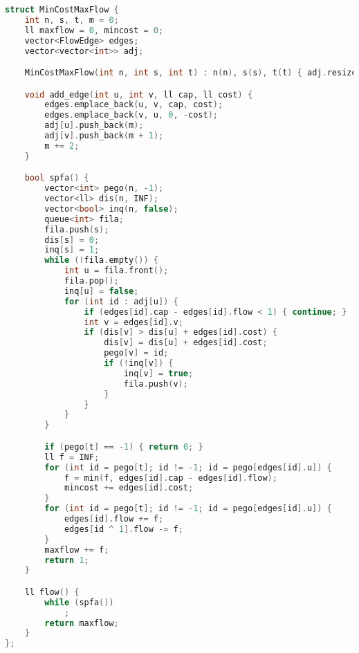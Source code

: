 \documentclass[11pt, a4paper, twoside]{book}
\begin{document}
\begin{lstlisting}[language=C++]
struct MinCostMaxFlow {
    int n, s, t, m = 0;
    ll maxflow = 0, mincost = 0;
    vector<FlowEdge> edges;
    vector<vector<int>> adj;

    MinCostMaxFlow(int n, int s, int t) : n(n), s(s), t(t) { adj.resize(n); }

    void add_edge(int u, int v, ll cap, ll cost) {
        edges.emplace_back(u, v, cap, cost);
        edges.emplace_back(v, u, 0, -cost);
        adj[u].push_back(m);
        adj[v].push_back(m + 1);
        m += 2;
    }

    bool spfa() {
        vector<int> pego(n, -1);
        vector<ll> dis(n, INF);
        vector<bool> inq(n, false);
        queue<int> fila;
        fila.push(s);
        dis[s] = 0;
        inq[s] = 1;
        while (!fila.empty()) {
            int u = fila.front();
            fila.pop();
            inq[u] = false;
            for (int id : adj[u]) {
                if (edges[id].cap - edges[id].flow < 1) { continue; }
                int v = edges[id].v;
                if (dis[v] > dis[u] + edges[id].cost) {
                    dis[v] = dis[u] + edges[id].cost;
                    pego[v] = id;
                    if (!inq[v]) {
                        inq[v] = true;
                        fila.push(v);
                    }
                }
            }
        }

        if (pego[t] == -1) { return 0; }
        ll f = INF;
        for (int id = pego[t]; id != -1; id = pego[edges[id].u]) {
            f = min(f, edges[id].cap - edges[id].flow);
            mincost += edges[id].cost;
        }
        for (int id = pego[t]; id != -1; id = pego[edges[id].u]) {
            edges[id].flow += f;
            edges[id ^ 1].flow -= f;
        }
        maxflow += f;
        return 1;
    }

    ll flow() {
        while (spfa())
            ;
        return maxflow;
    }
};
\end{lstlisting}

\hfill
\end{document}
